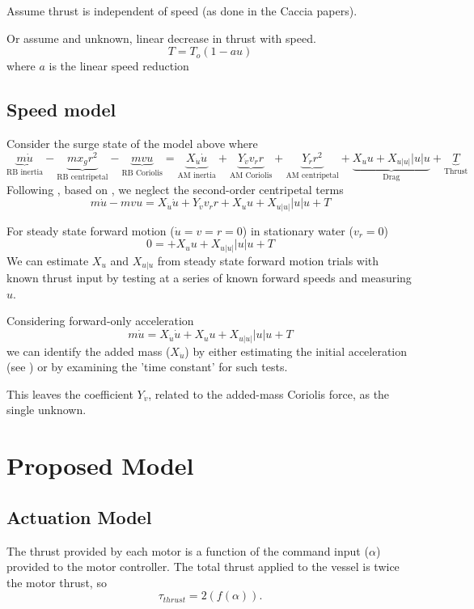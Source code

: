 \documentclass[11pt,draftcls,journal,onecolumn]{IEEEtran}
\begin{document}
Assume thrust is independent of speed (as done in the Caccia papers).

Or assume and unknown, linear decrease in thrust with speed.
\[
T = T_o (1-au)
\]
where $a$ is the linear speed reduction
\subsection{Speed model}
Consider the surge state of the model above where
\begin{equation}
\underbrace{m \dot{u}}_\text{RB inertia}  
- \underbrace{m x_g r^2}_\text{RB centripetal}
- \underbrace{mvu}_\text{RB Coriolis}
=
\underbrace{X_{\dot{u}} \dot{u}}_\text{AM inertia}
+ \underbrace{Y_{\dot{v}}v_r r}_\text{AM Coriolis}
+ \underbrace{Y_{\dot{r}}r^2}_\text{AM centripetal}
+ \underbrace{X_u u + X_{u|u|}|u|u}_\text{Drag} 
+ \underbrace{T}_\text{Thrust}
\end{equation}
Following \cite{caccia08practical}, based on \cite{fossen94guidance}, we neglect the second-order centripetal terms
\begin{equation}
m \dot{u}
- mvu
=
X_{\dot{u}} \dot{u}
+ Y_{\dot{v}}v_r r
+ X_u u + X_{u|u|}|u|u
+ T
\end{equation}

For steady state forward motion ($\dot{u}=v=r=0$) in stationary water ($v_r=0$)
\begin{equation}
0 =
+ X_u u + X_{u|u|}|u|u
+ T
\end{equation}
We can estimate $X_u$ and $X_{u|u}$ from steady state forward motion trials with known thrust input by testing at a series of known forward speeds and measuring $u$.

Considering forward-only acceleration
\begin{equation}
m \dot{u}
=
X_{\dot{u}} \dot{u}
+ X_u u + X_{u|u|}|u|u
+ T
\end{equation}
we can identify the added mass ($X_{\dot{u}}$) by either estimating the initial acceleration (see \cite{sonnenburg10control}) or by examining the 'time constant' for such tests.

This leaves the coefficient $Y_{\dot{v}}$, related to the added-mass Coriolis force, as the single unknown.


\section{Proposed Model}

\subsection{Actuation Model}
The thrust provided by each motor is a function of the command input ($\alpha$) provided to the motor controller.  The total thrust applied to the vessel is twice the motor thrust, so
\begin{equation}
\tau_{thrust}= 2 (f(\alpha)).
\label{e:thrust}
\end{equation}
\end{document}
